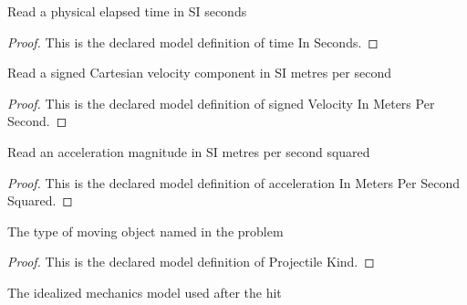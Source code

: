 \begin{definition}
  \label{def:physics:phyx-mini-0747:phyxminiproblems-problemphyxmini0747-timeinseconds}
  Read a physical elapsed time in SI seconds
\end{definition}
\begin{proof}
  This is the declared model definition of time In Seconds.
\end{proof}
\begin{definition}
  \label{def:physics:phyx-mini-0747:phyxminiproblems-problemphyxmini0747-signedvelocityinmeterspersecond}
  Read a signed Cartesian velocity component in SI metres per second
\end{definition}
\begin{proof}
  This is the declared model definition of signed Velocity In Meters Per Second.
\end{proof}
\begin{definition}
  \label{def:physics:phyx-mini-0747:phyxminiproblems-problemphyxmini0747-accelerationinmeterspersecondsquared}
  Read an acceleration magnitude in SI metres per second squared
\end{definition}
\begin{proof}
  This is the declared model definition of acceleration In Meters Per Second Squared.
\end{proof}
\begin{definition}
  \label{def:physics:phyx-mini-0747:phyxminiproblems-problemphyxmini0747-projectilekind}
  The type of moving object named in the problem
\end{definition}
\begin{proof}
  This is the declared model definition of Projectile Kind.
\end{proof}
\begin{definition}
  \label{def:physics:phyx-mini-0747:phyxminiproblems-problemphyxmini0747-projectilemodel}
  The idealized mechanics model used after the hit
\end{definition}
